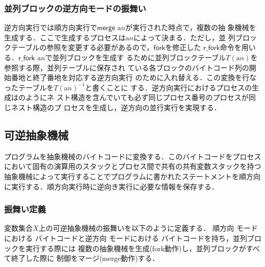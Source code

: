 \documentclass[submit,PRO]{ipsj}
\newcommand{\bcode}[1]{$\mathsf{#1}$}
\newcommand{\alabel}[1]{\mathrm{a}#1}
\begin{document}
\subsubsection{並列ブロックの逆方向モードの振舞い}

逆方向実行では順方向実行で\bcode{merge} $\alabel{n}$が実行された時点で，複数の抽
象機械を生成する．ここで生成するプロセスは$\alabel{n}$によって決まる．ただし，並
列ブロックテーブルの参照を変更する必要があるので，\bcode{fork}を修正した
\bcode{r\_fork}命令を用いる．\bcode{r\_fork} $\alabel{n}$で並列ブロックを生成す
るために並列ブロックテーブル$T(\alabel{n})$を参照する際，並列テーブルに保存され
ている各ブロックのバイトコード列の開始番地と終了番地を対応する逆方向実行
のために入れ替える．この変換を行なったテーブルを$T(\alabel{n})^{-1}$と書くことに
する．逆方向実行におけるプロセスの生成はのようにネ
スト構造を含んでいても必ず同じプロセス番号のプロセスが同じネスト構造のプ
ロセスを生成し，逆方向の並行実行を実現する．


\subsection{可逆抽象機械}
\label{sec:format}

プログラムを抽象機械のバイトコードに変換する．このバイトコードをプロセス
において固有の演算用のスタックとプロセス間で共有の共有変数スタックを持つ
抽象機械によって実行することでプログラムに書かれたステートメントを順方向
に実行する．順方向実行時に逆向き実行に必要な情報を保存する．

\subsubsection{振舞い定義}

変数集合$X$上の可逆抽象機械の振舞いを以下のように定義する．
順方向%
モードにおける%
バイトコードと逆方向%
モードにおける%
バイトコードを持ち，並列ブロックを実行する際には
複数の抽象機械を生成(fork動作)し，並列ブロックがすべて終了した際に
制御をマージ(merge動作)する．
\end{document}
